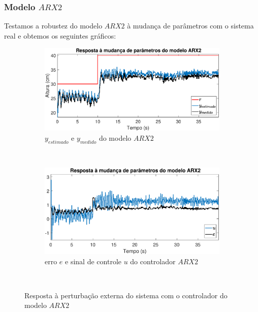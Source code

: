 \subsubsection{Modelo $ARX2$}
Testamos a robustez do modelo $ARX2$ à mudança de parâmetros com o sistema real e obtemos os seguintes gráficos:
\begin{figure}[htb]
	\centering
	\begin{subfigure}[t]{0.48\textwidth}
		\includegraphics[width=1\linewidth]{mprarx2y}
		\caption[$y_{estimado}$ e $y_{medido}$ do modelo $ARX2$]{$y_{estimado}$ e $y_{medido}$ do modelo $ARX2$}
		\label{fig:mprarx2y}
	\end{subfigure}
	~ %
	\begin{subfigure}[t]{0.48\textwidth}
		\includegraphics[width=1\linewidth]{mprarx2e}
		\caption[erro $e$ e sinal de controle $u$ do controlador $ARX2$]{erro $e$ e sinal de controle $u$ do controlador $ARX2$}
		\label{fig:mprarx2e}
	\end{subfigure}
	~ %
	
	\caption{Resposta à perturbação externa do sistema com o controlador do modelo $ARX2$}\label{fig:mprarx2}
\end{figure}

